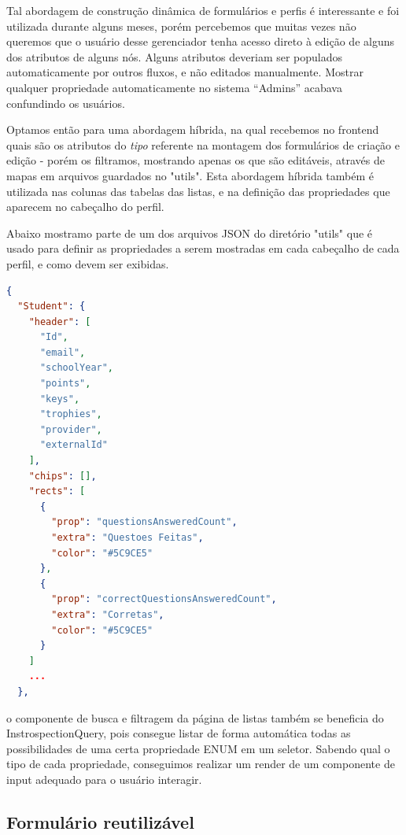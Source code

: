 Tal abordagem de construção dinâmica de formulários e perfis é interessante e foi utilizada durante alguns meses, porém percebemos que muitas vezes não queremos que o usuário desse gerenciador tenha acesso direto à edição de alguns dos atributos de alguns nós. Alguns atributos deveriam ser populados automaticamente por outros fluxos, e não editados manualmente. Mostrar qualquer propriedade automaticamente no sistema ``Admins'' acabava confundindo os usuários.

Optamos então para uma abordagem híbrida, na qual recebemos no frontend quais são os atributos do \textit{tipo} referente na montagem dos formulários de criação e edição - porém os filtramos, mostrando apenas os que são editáveis, através de mapas em arquivos guardados no "utils". Esta abordagem híbrida também é utilizada nas colunas das tabelas das listas, e na definição das propriedades que aparecem no cabeçalho do perfil.

Abaixo mostramo parte de um dos arquivos JSON do diretório "utils" que é usado para definir as propriedades a serem mostradas em cada cabeçalho de cada perfil, e como devem ser exibidas.
\begin{lstlisting}[language=JSON]
{
  "Student": {
    "header": [
      "Id",
      "email",
      "schoolYear",
      "points",
      "keys",
      "trophies",
      "provider",
      "externalId"
    ],
    "chips": [],
    "rects": [
      {
        "prop": "questionsAnsweredCount",
        "extra": "Questoes Feitas",
        "color": "#5C9CE5"
      },
      {
        "prop": "correctQuestionsAnsweredCount",
        "extra": "Corretas",
        "color": "#5C9CE5"
      }
    ]
    ...
  },
\end{lstlisting}

o componente de busca e filtragem da página de listas também se beneficia do InstrospectionQuery, pois consegue listar de forma automática todas as possibilidades de uma certa propriedade ENUM em um seletor. Sabendo qual o tipo de cada propriedade, conseguimos realizar um render de um componente de input adequado para o usuário interagir.

\subsection{Formulário reutilizável}


